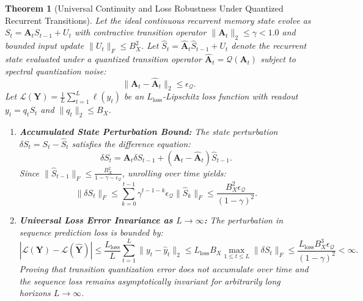 \documentclass[journal]{IEEEtran}
\newtheorem{theorem}{Theorem}
\begin{document}
\begin{theorem}[Universal Continuity and Loss Robustness Under Quantized Recurrent Transitions]
Let the ideal continuous recurrent memory state evolve as $S_t = \mathbf{A}_t S_{t-1} + U_t$ with contractive transition operator $\|\mathbf{A}_t\|_2 \le \gamma < 1.0$ and bounded input update $\|U_t\|_F \le B_X^2$.
Let $\hat{S}_t = \hat{\mathbf{A}}_t \hat{S}_{t-1} + U_t$ denote the recurrent state evaluated under a quantized transition operator $\hat{\mathbf{A}}_t = \mathcal{Q}(\mathbf{A}_t)$ subject to spectral quantization noise:
\begin{equation}
\|\mathbf{A}_t - \hat{\mathbf{A}}_t\|_2 \le \epsilon_{\mathcal{Q}}.
\end{equation}
Let $\mathcal{L}(\mathbf{Y}) = \frac{1}{L} \sum_{t=1}^L \ell(y_t)$ be an $L_{\text{loss}}$-Lipschitz loss function with readout $y_t = q_t S_t$ and $\|q_t\|_2 \le B_X$.

\begin{enumerate}
    \item \textbf{Accumulated State Perturbation Bound:}
    The state perturbation $\delta S_t = S_t - \hat{S}_t$ satisfies the difference equation:
    \begin{equation}
    \delta S_t = \mathbf{A}_t \delta S_{t-1} + (\mathbf{A}_t - \hat{\mathbf{A}}_t) \hat{S}_{t-1}.
    \end{equation}
    Since $\|\hat{S}_{t-1}\|_F \le \frac{B_X^2}{1 - \gamma - \epsilon_{\mathcal{Q}}}$, unrolling over time yields:
    \begin{equation}
    \|\delta S_t\|_F \le \sum_{k=0}^{t-1} \gamma^{t-1-k} \epsilon_{\mathcal{Q}} \|\hat{S}_k\|_F \le \frac{B_X^2 \epsilon_{\mathcal{Q}}}{(1 - \gamma)^2}.
    \end{equation}

    \item \textbf{Universal Loss Error Invariance as $L \to \infty$:}
    The perturbation in sequence prediction loss is bounded by:
    \begin{equation}
    |\mathcal{L}(\mathbf{Y}) - \mathcal{L}(\hat{\mathbf{Y}})| \le \frac{L_{\text{loss}}}{L} \sum_{t=1}^L \|y_t - \hat{y}_t\|_2 \le L_{\text{loss}} B_X \max_{1 \le t \le L} \|\delta S_t\|_F \le \frac{L_{\text{loss}} B_X^3 \epsilon_{\mathcal{Q}}}{(1 - \gamma)^2} < \infty.
    \end{equation}
    Proving that transition quantization error does not accumulate over time and the sequence loss remains asymptotically invariant for arbitrarily long horizons $L \to \infty$.
\end{enumerate}
\end{theorem}
\end{document}
